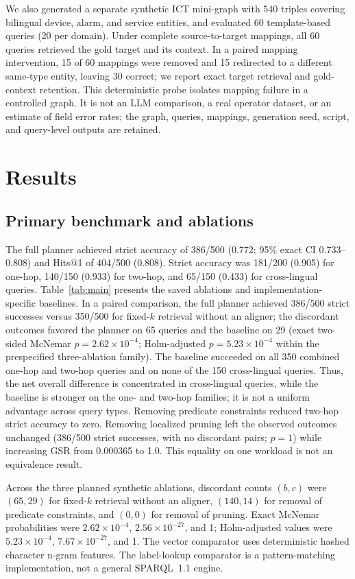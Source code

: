 \documentclass[a4paper,fleqn]{cas-dc}
\begin{document}
We also generated a separate synthetic ICT mini-graph with 540 triples covering bilingual device, alarm, and service entities, and evaluated 60 template-based queries (20 per domain). Under complete source-to-target mappings, all 60 queries retrieved the gold target and its context. In a paired mapping intervention, 15 of 60 mappings were removed and 15 redirected to a different same-type entity, leaving 30 correct; we report exact target retrieval and gold-context retention. This deterministic probe isolates mapping failure in a controlled graph. It is not an LLM comparison, a real operator dataset, or an estimate of field error rates; the graph, queries, mappings, generation seed, script, and query-level outputs are retained.

\section{Results}\label{sec:results}
\subsection{Primary benchmark and ablations}
The full planner achieved strict accuracy of 386/500 (0.772; 95\% exact CI 0.733--0.808) and Hits@1 of 404/500 (0.808). Strict accuracy was 181/200 (0.905) for one-hop, 140/150 (0.933) for two-hop, and 65/150 (0.433) for cross-lingual queries. Table~\ref{tab:main} presents the saved ablations and implementation-specific baselines. In a paired comparison, the full planner achieved 386/500 strict successes versus 350/500 for fixed-$k$ retrieval without an aligner; the discordant outcomes favored the planner on 65 queries and the baseline on 29 (exact two-sided McNemar $p=2.62\times10^{-4}$; Holm-adjusted $p=5.23\times10^{-4}$ within the prespecified three-ablation family). The baseline succeeded on all 350 combined one-hop and two-hop queries and on none of the 150 cross-lingual queries. Thus, the net overall difference is concentrated in cross-lingual queries, while the baseline is stronger on the one- and two-hop families; it is not a uniform advantage across query types. Removing predicate constraints reduced two-hop strict accuracy to zero. Removing localized pruning left the observed outcomes unchanged (386/500 strict successes, with no discordant pairs; $p=1$) while increasing GSR from 0.000365 to 1.0. This equality on one workload is not an equivalence result.

Across the three planned synthetic ablations, discordant counts $(b,c)$ were $(65,29)$ for fixed-$k$ retrieval without an aligner, $(140,14)$ for removal of predicate constraints, and $(0,0)$ for removal of pruning. Exact McNemar probabilities were $2.62\times10^{-4}$, $2.56\times10^{-27}$, and 1; Holm-adjusted values were $5.23\times10^{-4}$, $7.67\times10^{-27}$, and 1. The vector comparator uses deterministic hashed character n-gram features. The label-lookup comparator is a pattern-matching implementation, not a general SPARQL~1.1 engine.
\end{document}

